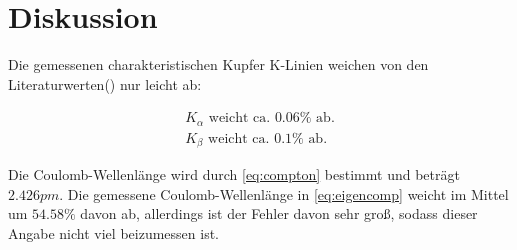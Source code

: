\newpage
\section{Diskussion}
\label{sec:Diskussion}

Die gemessenen charakteristischen Kupfer K-Linien weichen von den Literaturwerten(\cite{kline}) nur leicht ab:

\begin{align*}
    K_{\alpha} \text{ weicht ca. } 0.06\% \text{ ab.}\\
    K_{\beta} \text{ weicht ca. } 0.1\% \text{ ab.}
\end{align*}

Die Coulomb-Wellenlänge wird durch \autoref{eq:compton} bestimmt und beträgt $2.426pm$.
Die gemessene Coulomb-Wellenlänge in \autoref{eq:eigencomp} weicht im Mittel um $54.58\%$ davon ab, allerdings ist der Fehler davon sehr groß, sodass dieser Angabe nicht viel beizumessen ist.